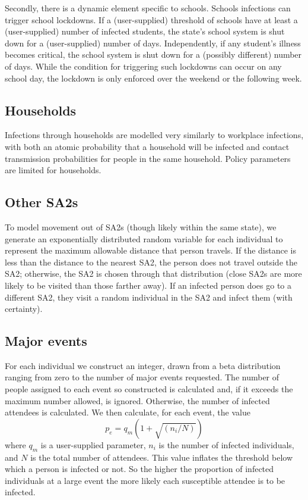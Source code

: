 \documentclass[submission]{grattan}
\begin{document}
Secondly, there is a dynamic element specific to schools. Schools infections can trigger school
lockdowns. If a (user-supplied) threshold of schools have at least a (user-supplied) number of
infected students, the state's school system is shut down for a (user-supplied) number of days.
Independently, if any student's illness becomes critical, the school system is shut down for
a (possibly different) number of days.  While the condition for triggering such lockdowns can occur
on any school day, the lockdown is only enforced over the weekend or the following week.

\subsection{Households}

Infections through households are modelled very similarly to workplace infections,
with both an atomic probability that a household will be infected and contact
transmission probabilities for people in the same household.
Policy parameters are limited for households.

\subsection{Other SA2s}

To model movement out of SA2s (though likely within the same state),
we generate an exponentially distributed random variable
for each individual to represent the maximum allowable distance that person
travels. If the distance is less than the distance to the nearest SA2, the person
does not travel outside the SA2; otherwise, the SA2 is chosen through that distribution
(close SA2s are more likely to be visited than those farther away).
 If an infected person does go to a different SA2, they visit a random individual in the SA2 and
 infect them (with certainty).

\subsection{Major events}
For each individual we construct an integer, drawn from a beta distribution ranging from zero
to the number of major events requested. The number of people assigned to each event so constructed
is calculated and, if it exceeds the maximum number allowed, is ignored. Otherwise, the number of
infected attendees is calculated. We then calculate, for each event, the value
\[p_e = q_m(1 + \sqrt{(n_i / N)}) \]
where \(q_m\) is a user-supplied parameter, \(n_i\) is the number of infected individuals, and \(N\)
is the total number of attendees. This value inflates the threshold below which a person is infected
or not. So the higher the proportion of infected individuals at a large event the more likely each
susceptible attendee is to be infected.
\end{document}
